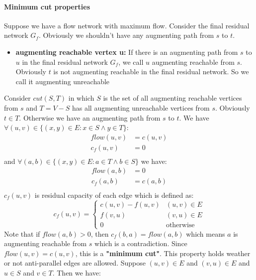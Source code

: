 \documentclass{book}
\begin{document}
	\paragraph{Minimum cut properties}
	Suppose we have a flow network with maximum flow. Consider the final residual network $G_f$. Obviously we shouldn't have any augmenting path from $s$ to $t$.
	\begin{itemize}
		\item[] \textbf{augmenting reachable vertex u:} If there is an augmenting path from $s$ to $u$ in the final residual network $G_f$, we call $u$ augmenting reachable from $s$. Obviously $t$ is not augmenting reachable in the final residual network. So we call it augmenting unreachable
	\end{itemize}
	Consider $cut(S, T)$ in which $S$ is the set of all augmenting reachable vertices from $s$ and $T = V - S$ has all augmenting unreachable vertices from $s$. Obviously $t \in T$. Otherwise we have an augmenting path from $s$ to $t$. We have $\forall (u, v) \in \{(x, y) \in E : x \in S \land y \in T \}$:
	\begin{equation*}
	\begin{split}
	flow(u, v) &= c(u, v) \\
	c_f(u, v) &= 0 \\
	\end{split}		
	\end{equation*}
	and $\forall (a, b) \in \{(x, y) \in E : a \in T \land b \in S \}$ we have:
	\begin{equation*}
	\begin{split}
	flow(a, b) &= 0 \\
	c_f(a, b) &= c(a, b) \\
	\end{split}		
	\end{equation*}	
	$c_f(u, v)$ is residual capacity of each edge which is defined as:
	\begin{equation*}
		c_f(u, v) = \begin{cases}
		c(u, v) - f(u, v) & (u, v) \in E \\
		f(v, u) & (v, u) \in E \\
		0 & \text{otherwise}
		\end{cases}
	\end{equation*}
	Note that if $flow(a, b) > 0$, then $c_f(b, a) = flow(a, b)$ which means $a$ is augmenting reachable from $s$ which is a contradiction. Since $flow(u, v) = c(u, v)$, this is a \textbf{"minimum cut"}. This property holds weather or not anti-parallel edges are allowed. Suppose $(u, v) \in E$ and $(v, u) \in E$ and $u \in S$ and $v \in T$. Then we have:
\end{document}
